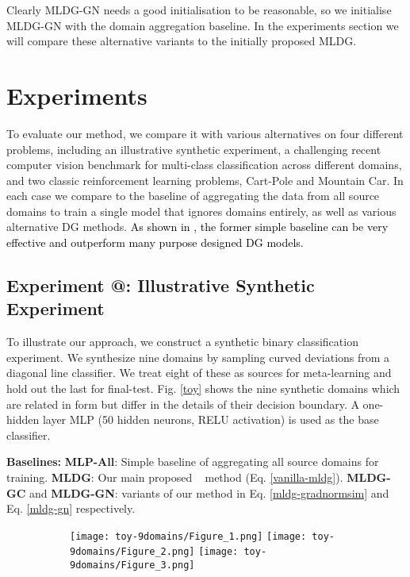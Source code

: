 \documentclass[letterpaper]{article} \usepackage{aaai18}  \usepackage{times}  \usepackage{helvet}  \usepackage{courier}  \usepackage{url}  \usepackage{graphicx}  \usepackage{amsmath}
\makeatletter
\newcommand*{\rom}[1]{\expandafter\@slowromancap\romannumeral #1@}
\newcommand{\name}[1]{MLDG}
\makeatother
\begin{document}
{Clearly MLDG-GN needs a good initialisation to be reasonable, so we initialise MLDG-GN with the domain aggregation baseline. In the experiments section we will compare these alternative variants to the initially proposed MLDG.

\section{Experiments}
To evaluate our method, we compare it with various alternatives on four different problems, including an illustrative synthetic experiment, a challenging recent computer vision benchmark for multi-class classification across different domains, and two classic reinforcement learning problems, Cart-Pole and Mountain Car. In each case we compare to the baseline of aggregating the data from all source domains to train a single model that ignores domains entirely, as well as various alternative DG methods. \textcolor{black}{As shown in \cite{da2017dg}, the former simple baseline can be very effective and outperform many purpose designed DG models.}

\subsection{Experiment \rom{1}: Illustrative Synthetic Experiment}
To illustrate our approach, we construct a synthetic binary classification experiment. We synthesize nine domains by sampling curved deviations from a diagonal line classifier. We treat eight of these as sources for meta-learning and hold out the last for final-test. Fig. \ref{toy} shows the nine synthetic domains which are related in form but differ in the details of their decision boundary. A one-hidden layer MLP (50 hidden neurons, RELU activation) is used as the base classifier. 



\vspace{0.1cm}\noindent \textbf{Baselines:} \quad \textbf{MLP-All}: Simple baseline of aggregating all source domains for training. \textbf{MLDG}: Our main proposed \name~ method (Eq. \ref{vanilla-mldg}). 
\textbf{MLDG-GC} and \textbf{MLDG-GN}: variants of our method in 
Eq. \ref{mldg-gradnormsim} and Eq. \ref{mldg-gn} respectively.

\begin{figure}[t]
\centering
\begin{subfigure}{1.0\columnwidth}
\texttt{[image: toy-9domains/Figure\_1.png]}
\texttt{[image: toy-9domains/Figure\_2.png]}
\texttt{[image: toy-9domains/Figure\_3.png]}


\end{subfigure}
\end{figure}}
\end{document}
